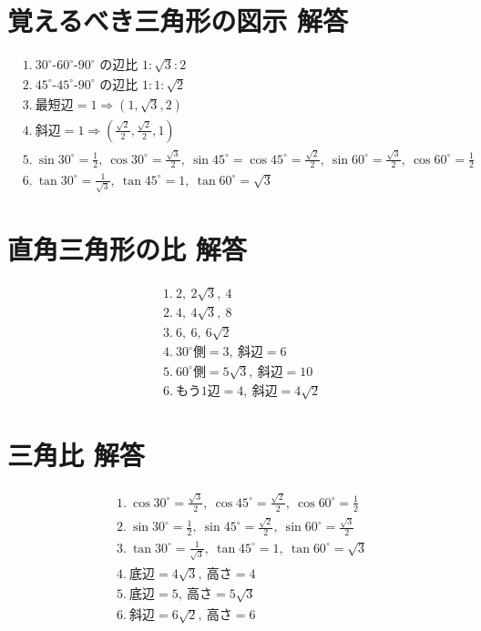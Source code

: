 \documentclass[paper=b4j,landscape,twocolumn,fleqn]{jlreq}
\begin{document}
\normalsize
\section{覚えるべき三角形の図示 解答}
\begin{align*}
&1.\ 30^\circ\text{-}60^\circ\text{-}90^\circ\text{ の辺比 }1:\sqrt{3}:2\\[0.45em]
&2.\ 45^\circ\text{-}45^\circ\text{-}90^\circ\text{ の辺比 }1:1:\sqrt{2}\\[0.45em]
&3.\ \text{最短辺}=1\Rightarrow (1,\sqrt{3},2)\\[0.45em]
&4.\ \text{斜辺}=1\Rightarrow \left(\frac{\sqrt{2}}{2},\frac{\sqrt{2}}{2},1\right)\\[0.45em]
&5.\ \sin30^\circ=\frac12,\ \cos30^\circ=\frac{\sqrt3}{2},\ \sin45^\circ=\cos45^\circ=\frac{\sqrt2}{2},\ \sin60^\circ=\frac{\sqrt3}{2},\ \cos60^\circ=\frac12\\[0.45em]
&6.\ \tan30^\circ=\frac{1}{\sqrt3},\ \tan45^\circ=1,\ \tan60^\circ=\sqrt3
\end{align*}

\section{直角三角形の比 解答}
\begin{align*}
&1.\ 2,\ 2\sqrt3,\ 4\\[0.45em]
&2.\ 4,\ 4\sqrt3,\ 8\\[0.45em]
&3.\ 6,\ 6,\ 6\sqrt2\\[0.45em]
&4.\ 30^\circ\text{側}=3,\ \text{斜辺}=6\\[0.45em]
&5.\ 60^\circ\text{側}=5\sqrt3,\ \text{斜辺}=10\\[0.45em]
&6.\ \text{もう1辺}=4,\ \text{斜辺}=4\sqrt2
\end{align*}

\section{三角比 解答}
\begin{align*}
&1.\ \cos30^\circ=\frac{\sqrt3}{2},\ \cos45^\circ=\frac{\sqrt2}{2},\ \cos60^\circ=\frac12\\[0.45em]
&2.\ \sin30^\circ=\frac12,\ \sin45^\circ=\frac{\sqrt2}{2},\ \sin60^\circ=\frac{\sqrt3}{2}\\[0.45em]
&3.\ \tan30^\circ=\frac{1}{\sqrt3},\ \tan45^\circ=1,\ \tan60^\circ=\sqrt3\\[0.45em]
&4.\ \text{底辺}=4\sqrt3,\ \text{高さ}=4\\[0.45em]
&5.\ \text{底辺}=5,\ \text{高さ}=5\sqrt3\\[0.45em]
&6.\ \text{斜辺}=6\sqrt2,\ \text{高さ}=6
\end{align*}
\end{document}

